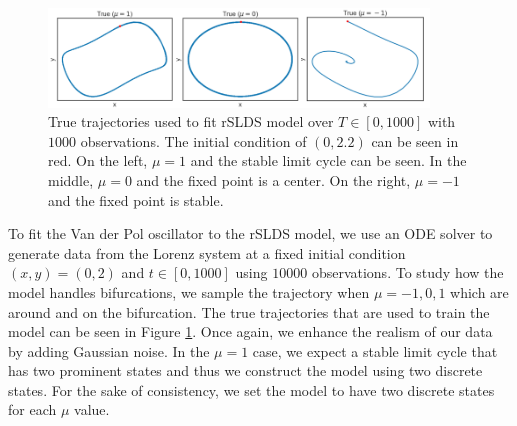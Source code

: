 \begin{figure}
    \centering
    \includegraphics[width=0.90\textwidth,height=\textwidth,keepaspectratio]{./figures/paper_fig10.png}
    \caption{True trajectories used to fit rSLDS model over $T\in[0,1000]$ with $1000$ observations. The initial condition of $(0,2.2)$ can be seen in red. On the left, $\mu =1$ and the stable limit cycle can be seen. In the middle, $\mu = 0$ and the fixed point is a center. On the right, $\mu = -1$ and the fixed point is stable.}
    \label{trueVDP}
\end{figure}

To fit the Van der Pol oscillator to the rSLDS model, we use an ODE solver to generate data from the Lorenz system at a fixed initial condition $(x,y) = (0,2)$ and $t \in [0,1000]$ using $10000$ observations. To study how the model handles bifurcations, we sample the trajectory when $\mu = -1,0,1$ which are around and on the bifurcation. The true trajectories that are used to train the model can be seen in Figure \ref{trueVDP}. Once again, we enhance the realism of our data by adding Gaussian noise. In the $\mu = 1$ case, we expect a stable limit cycle that has two prominent states and thus we construct the model using two discrete states. For the sake of consistency, we set the model to have two discrete states for each $\mu$ value. 

